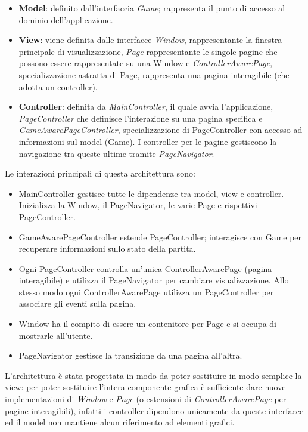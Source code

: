 \documentclass[a4paper,12pt]{report}
\begin{document}
\begin{itemize}
	\item \textbf{Model}: definito dall'interfaccia \textit{Game}; rappresenta il punto di accesso
	al dominio dell'applicazione.
	\item \textbf{View}: viene definita dalle interfacce \textit{Window}, rappresentante la finestra
	principale di visualizzazione, \textit{Page} rappresentante le singole pagine che possono
	essere rappresentate su una Window e \textit{ControllerAwarePage}, specializzazione astratta di Page,
	rappresenta una pagina interagibile (che adotta un controller).
	\item \textbf{Controller}: definita da \textit{MainController}, il quale avvia l'applicazione,
	\textit{PageController} che definisce l'interazione su una pagina specifica e
	\textit{GameAwarePageController}, specializzazione di PageController con accesso
	ad informazioni sul model (Game). I controller per le pagine gestiscono la navigazione
	tra queste ultime tramite \textit{PageNavigator}.
\end{itemize}

Le interazioni principali di questa architettura sono:
\begin{itemize}
	\item MainController gestisce tutte le dipendenze
	tra model, view e controller. Inizializza la Window,
	il PageNavigator, le varie Page e rispettivi PageController.
	\item GameAwarePageController estende PageController; interagisce con
	Game per recuperare informazioni sullo stato della partita.
	\item Ogni PageController controlla un'unica ControllerAwarePage (pagina interagibile) e
	utilizza il PageNavigator per cambiare visualizzazione. Allo stesso modo ogni ControllerAwarePage
	utilizza un PageController per associare gli eventi sulla pagina.
	\item Window ha il compito di essere un contenitore per Page e si
	occupa di mostrarle all'utente.
	\item PageNavigator gestisce la transizione
	da una pagina all'altra.
\end{itemize}

L'architettura è stata progettata in modo da poter sostituire
in modo semplice la view: per poter sostituire l'intera componente
grafica è sufficiente dare nuove implementazioni di \textit{Window}
e \textit{Page} (o estensioni di \textit{ControllerAwarePage} per pagine interagibili),
infatti i controller dipendono unicamente
da queste interfacce ed il model non mantiene alcun riferimento
ad elementi grafici.
\end{document}
